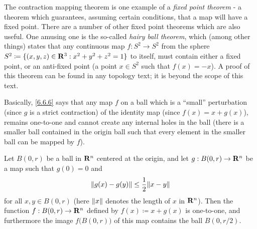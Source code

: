 \begin{remark}\label{6.6.5}
  The contraction mapping theorem is one example of a \emph{fixed point theorem}
  - a theorem which guarantees, assuming certain conditions, that a map will have a fixed point.
  There are a number of other fixed point theorems which are also useful.
  One amusing one is the so-called \emph{hairy ball theorem}, which (among other things) states that any continuous map \(f : S^2 \to S^2\) from the sphere \(S^2 \coloneqq \{(x, y, z) \in \R^3 : x^2 + y^2 + z^2 = 1\}\) to itself, must contain either a fixed point, or an anti-fixed point
  (a point \(x \in S^2\) such that \(f(x) = -x\)).
  A proof of this theorem can be found in any topology text;
  it is beyond the scope of this text.
\end{remark}

\begin{note}
  Basically, \cref{6.6.6} says that any map \(f\) on a ball which is a ``small'' perturbation (since \(g\) is a strict contraction) of the identity map (since \(f(x) = x + g(x)\)), remains one-to-one and cannot create any internal holes in the ball
  (there is a smaller ball contained in the origin ball such that every element in the smaller ball can be mapped by \(f\)).
\end{note}

\begin{lemma}\label{6.6.6}
  Let \(B(0, r)\) be a ball in \(\R^n\) centered at the origin, and let \(g : B(0, r) \to \R^n\) be a map such that \(g(0) = 0\) and
  \[
    \norm*{g(x) - g(y)} \leq \frac{1}{2} \norm*{x - y}
  \]
  for all \(x, y \in B(0, r)\)
  (here \(\norm*{x}\) denotes the length of \(x\) in \(\R^n\)).
  Then the function \(f : B(0, r) \to \R^n\) defined by \(f(x) \coloneqq x + g(x)\) is one-to-one, and furthermore the image \(f\big(B(0, r)\big)\) of this map contains the ball \(B(0, r / 2)\).
\end{lemma}

